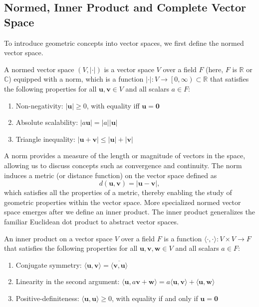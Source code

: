 \subsection{Normed, Inner Product and Complete Vector Space}\label{sec:normed_inner_product_complete_vector_space}
To introduce geometric concepts into vector spaces, we first define the normed vector space.
\begin{definition}
A normed vector space $(V,\lvert\cdot\rvert)$ is a vector space $V$ over a field $F$ (here, $F$ is $\mathbb{R}$ or $\mathbb{C}$) equipped with a norm, which is a function $\lvert\cdot\rvert:V\to\left[0,\infty\right)\subset\mathbb{R}$ that satisfies the following properties for all $\symbf{u},\symbf{v}\in V$ and all scalars $a\in F$:
\begin{enumerate}\def\labelenumi{\arabic{enumi}.}
\item Non-negativity: $\lvert\symbf{u}\rvert\geq 0$, with equality iff $\symbf{u}=\symbf{0}$
\item Absolute scalability: $\lvert a\symbf{u}\rvert=\lvert a\rvert\lvert\symbf{u}\rvert$
\item Triangle inequality: $\lvert\symbf{u}+\symbf{v}\rvert\leq\lvert\symbf{u}\rvert+\lvert\symbf{v}\rvert$
\end{enumerate}
\end{definition}
A norm provides a measure of the length or magnitude of vectors in the space, allowing us to discuss concepts such as convergence and continuity. The norm induces a metric (or distance function) on the vector space defined as
\begin{equation}
d(\symbf{u},\symbf{v})=\lvert\symbf{u}-\symbf{v}\rvert,
\end{equation}
which satisfies all the properties of a metric, thereby enabling the study of geometric properties within the vector space. More specialized normed vector space emerges after we define an inner product. The inner product generalizes the familiar Euclidean dot product to abstract vector spaces.
\begin{definition}\label{def:inner_product}
An inner product on a vector space $V$ over a field $F$ is a function $\langle\cdot,\cdot\rangle:V\times V\to F$ that satisfies the following properties for all $\symbf{u},\symbf{v},\symbf{w}\in V$ and all scalars $a\in F$:
\begin{enumerate}\def\labelenumi{\arabic{enumi}.}
\item Conjugate symmetry: $\langle\symbf{u},\symbf{v}\rangle=\overline{\langle\symbf{v},\symbf{u}\rangle}$
\item Linearity in the second argument: $\langle \symbf{u},a\symbf{v}+\symbf{w}\rangle=a\langle\symbf{u},\symbf{v}\rangle+\langle\symbf{u},\symbf{w}\rangle$
\item Positive-definiteness: $\langle\symbf{u},\symbf{u}\rangle\geq 0$, with equality if and only if $\symbf{u}=\symbf{0}$
\end{enumerate}
\end{definition}
